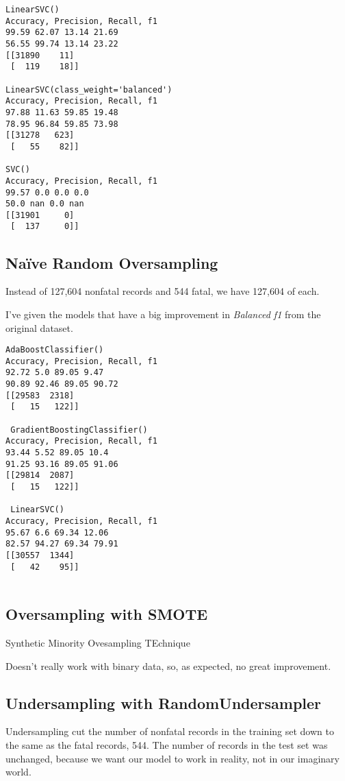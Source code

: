 \documentclass[11pt]{article}
\begin{document}
\begin{spacing}{1.2}
\begin{verbatim}
LinearSVC()
Accuracy, Precision, Recall, f1
99.59 62.07 13.14 21.69
56.55 99.74 13.14 23.22
[[31890    11]
 [  119    18]]

LinearSVC(class_weight='balanced')
Accuracy, Precision, Recall, f1
97.88 11.63 59.85 19.48
78.95 96.84 59.85 73.98
[[31278   623]
 [   55    82]]

SVC()
Accuracy, Precision, Recall, f1
99.57 0.0 0.0 0.0
50.0 nan 0.0 nan
[[31901     0]
 [  137     0]]

\end{verbatim}

\subsection{Na{\"i}ve Random Oversampling}

Instead of 127,604 nonfatal records and 544 fatal, we have 127,604 of each.  

I've given the models that have a big improvement in {\it Balanced f1} from the original dataset.  

\begin{verbatim}
AdaBoostClassifier()
Accuracy, Precision, Recall, f1
92.72 5.0 89.05 9.47
90.89 92.46 89.05 90.72
[[29583  2318]
 [   15   122]]
 
 GradientBoostingClassifier()
Accuracy, Precision, Recall, f1
93.44 5.52 89.05 10.4
91.25 93.16 89.05 91.06
[[29814  2087]
 [   15   122]]
 
 LinearSVC()
Accuracy, Precision, Recall, f1
95.67 6.6 69.34 12.06
82.57 94.27 69.34 79.91
[[30557  1344]
 [   42    95]]
 
\end{verbatim}

\subsection{Oversampling with SMOTE}

Synthetic Minority Ovesampling TEchnique

Doesn't really work with binary data, so, as expected, no great improvement.  

\subsection{Undersampling with RandomUndersampler}

Undersampling cut the number of nonfatal records in the training set down to the same as the fatal records, 544.  The number of records in the test set was unchanged, because we want our model to work in reality, not in our imaginary world.  


\end{spacing}
\end{document}
